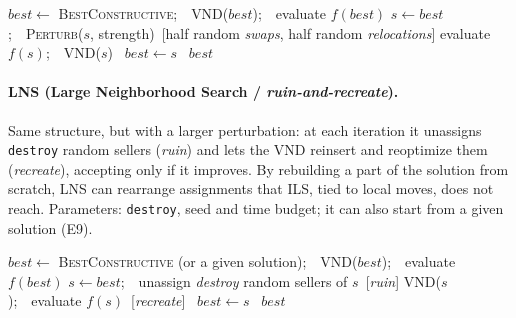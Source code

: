\documentclass[11pt,a4paper]{article}
\newcommand{\code}[1]{\texttt{#1}}
\begin{document}
\begin{algorithm}[H]
\caption{Metaheuristic: ILS (Iterated Local Search)}
\begin{algorithmic}[1]
  \State $best \gets$ \textsc{BestConstructive};\ \ \textsc{VND}($best$);\ \ evaluate $f(best)$
    \State $s \gets best$;\ \ \textsc{Perturb}($s$, strength)\ \small{[half random \textit{swaps}, half random \textit{relocations}]}
    \State evaluate $f(s)$;\ \ \textsc{VND}($s$)
    \ $best \gets s$\ \EndIf
  \EndWhile
  \State \Return $best$
\EndFunction
\end{algorithmic}
\end{algorithm}

\paragraph{LNS (Large Neighborhood Search / \emph{ruin-and-recreate}).} Same structure, but with a
larger perturbation: at each iteration it unassigns \code{destroy} random sellers (\emph{ruin}) and
lets the VND reinsert and reoptimize them (\emph{recreate}), accepting only if it improves. By
rebuilding a part of the solution from scratch, LNS can rearrange assignments that ILS, tied to
local moves, does not reach. Parameters: \code{destroy}, seed and time budget; it can also start
from a given solution (E9).

\begin{algorithm}[H]
\caption{Metaheuristic: LNS (Large Neighborhood Search)}
\begin{algorithmic}[1]
  \State $best \gets$ \textsc{BestConstructive} (or a given solution);\ \ \textsc{VND}($best$);\ \ evaluate $f(best)$
    \State $s \gets best$;\ \ unassign \textit{destroy} random sellers of $s$\ \small{[\textit{ruin}]}
    \State \textsc{VND}($s$);\ \ evaluate $f(s)$\ \small{[\textit{recreate}]}
    \ $best \gets s$\ \EndIf
  \EndWhile
  \State \Return $best$
\EndFunction
\end{algorithmic}
\end{algorithm}
\end{document}
